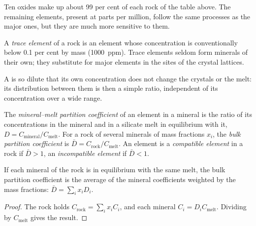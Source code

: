 Ten oxides make up about 99 per cent of each rock of the table above. The remaining elements,
present at parts per million, follow the same processes as the major ones, but
they are much more sensitive to them.

\begin{definition}\label{def:b2:elements-in-the-earth:trace}
A \emph{trace element} of a rock is an element whose
concentration is conventionally below 0.1 per cent by mass (\qty{1000}{ppm}).
Trace elements seldom form minerals of their own; they substitute for major
elements in the sites of the crystal lattices.
\end{definition}

A  is so dilute that its own concentration does not change the
crystals or the melt: its distribution between them is then a simple ratio,
independent of its concentration over a wide range.

\begin{definition}\label{def:b2:elements-in-the-earth:partition}
The \emph{mineral--melt partition coefficient}
of an element in a mineral is the ratio of its concentrations in the
mineral and in a silicate melt in equilibrium with it,
$D = C_{\mathrm{mineral}}/C_{\mathrm{melt}}$. For a rock of several minerals of
mass fractions $x_i$, the \emph{bulk partition coefficient} is
$\bar D = C_{\mathrm{rock}}/C_{\mathrm{melt}}$. An element is a
\emph{compatible element} in a rock if $\bar D > 1$,
an \emph{incompatible element} if $\bar D < 1$.
\end{definition}

\begin{proposition}
\label{prop:b2:elements-in-the-earth:bulk-d}
If each mineral of the rock is in equilibrium with the same melt, the bulk
partition coefficient is the average of the mineral coefficients weighted by
the mass fractions: $\bar D = \sum_i x_i D_i$.
\end{proposition}

\begin{proof}
The rock holds $C_{\mathrm{rock}} = \sum_i x_i C_i$, and each mineral
$C_i = D_i C_{\mathrm{melt}}$. Dividing by $C_{\mathrm{melt}}$ gives the result.
\end{proof}

